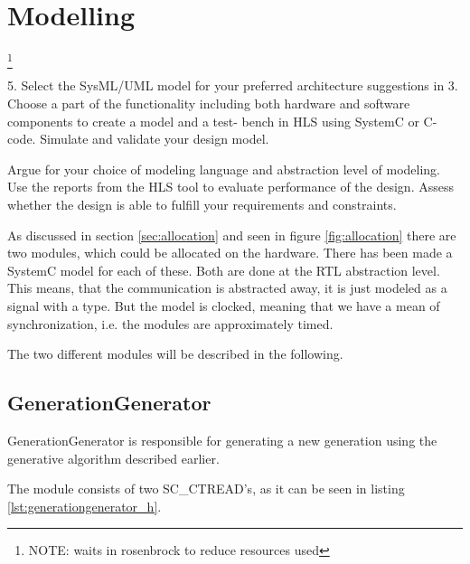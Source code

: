 \section{Modelling}
\footnote{\color{red}NOTE: waits in rosenbrock to reduce resources used}

\begin{framed}
5. Select the SysML/UML model for your preferred architecture suggestions in 3. Choose a part of the functionality including both hardware and software components to create a model and a test- bench in HLS using SystemC or C-code. Simulate and validate your design model.

Argue for your choice of modeling language and abstraction level of modeling. Use the reports from the HLS tool to evaluate performance of the design. Assess whether the design is able to fulfill your requirements and constraints.
\end{framed}

As discussed in section \ref{sec:allocation} and seen in figure \ref{fig:allocation} there are two modules, which could be allocated on the hardware. There has been made a SystemC model for each of these. Both are done at the RTL abstraction level. This means, that the communication is abstracted away, it is just modeled as a signal with a type. But the model is clocked, meaning that we have a mean of synchronization, i.e. the modules are approximately timed.

The two different modules will be described in the following.

\subsection{GenerationGenerator}
GenerationGenerator is responsible for generating a new generation using the generative algorithm described earlier.

The module consists of two SC\_CTREAD's, as it can be seen in listing \ref{lst:generationgenerator_h}.

